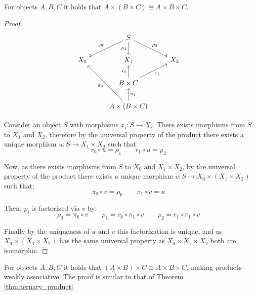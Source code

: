 \begin{theorem}\label{thm:ternary_product}
	For objects $A,B,C$ it holds that $A\times(B\times C)\cong A\times B\times C$.

	\begin{proof}
		\[\begin{tikzcd}[ampersand replacement=\&]
			\& S \\
			{X_0} \& {X_1} \& {X_2} \\
			\& {B\times C} \\
			\& {A\times(B\times C)}
			\arrow["{r_0}", from=3-2, to=2-2]
			\arrow["{r_1}"', from=3-2, to=2-3]
			\arrow["{\pi_0}", from=4-2, to=2-1]
			\arrow["{\pi_1}"', from=4-2, to=3-2]
			\arrow["{\rho_0}"', from=1-2, to=2-1]
			\arrow["{\rho_1}"', from=1-2, to=2-2]
			\arrow["{\rho_2}", from=1-2, to=2-3]
		\end{tikzcd}\]

		Consider an object $S$ with morphisms $x_i: S\to X_i$. There exists
		morphisms from $S$ to $X_1$ and $X_2$, therefore by the universal property
		of the product there exists a unique morphism $u: S\to X_1 \times X_2$ such
		that:
		\[
			r_0 \circ u = \rho_1
			\qquad
			r_1 \circ u = \rho_2
		\]

		Now, as there exists morphisms from $S$ to $X_0$ and $X_1\times X_2$, by the
		universal property of the product there exists a unique morphism $v: S \to
		X_0 \times(X_1 \times X_2)$ such that:
		\[
			\pi_0 \circ v = \rho_0
			\qquad
			\pi_1 \circ v = u
		\]

		Then, $\rho_i$ is factorized via $v$ by:
		\[
			\rho_0 = \pi_0 \circ v
			\qquad
			\rho_1 = r_0 \circ \pi_1 \circ v
			\qquad
			\rho_2 = r_1 \circ \pi_1 \circ v
		\]

		Finally by the uniqueness of $u$ and $v$ this factorization is unique, and
		as $X_0 \times(X_1 \times X_2)$ has the same universal property as $X_0
		\times X_1 \times X_2$ both are isomorphic.
	\end{proof}
\end{theorem}

\begin{proposition}
	For objects $A,B,C$ it holds that $(A\times B)\times C\cong A\times B\times
	C$, making products weakly associative. The proof is similar to that of Theorem \ref{thm:ternary_product}.
\end{proposition}

